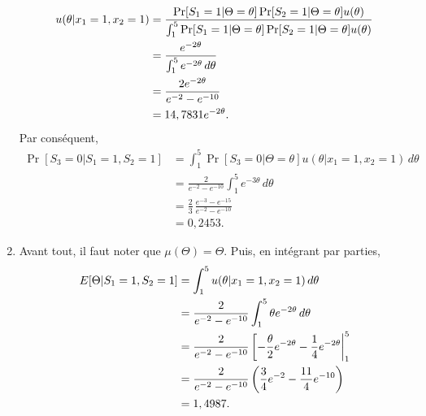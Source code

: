 \begin{exercice}
\begin{sol}
\begin{enumerate}
\begin{align*}
        u(\theta|x_1=1, x_2=1)
        &= \frac{\Pr[S_1 = 1|\Theta = \theta]
          \Pr[S_2 = 1|\Theta = \theta] u(\theta)}{%
          \int_1^5 \Pr[S_1 = 1|\Theta = \theta]
          \Pr[S_2 = 1|\Theta = \theta] u(\theta)} \\
        &= \frac{e^{-2 \theta}}{\int_1^5 e^{-2 \theta}\, d\theta} \\
        &= \frac{2 e^{-2 \theta}}{e^{-2} - e^{-10}} \\
        &= 14,7831 e^{-2\theta}.
      \end{align*}
      Par conséquent,
      \begin{align*}
        \Pr[S_3 = 0|S_1 = 1, S_2 = 1]
        &= \int_1^5 \Pr[S_3 = 0|\Theta = \theta]
        u(\theta|x_1=1, x_2=1)\, d\theta \\
        &= \frac{2}{e^{-2} - e^{-10}}
        \int_1^5 e^{-3 \theta}\, d\theta \\
        &= \frac{2}{3}\, \frac{e^{-3} - e^{-15}}{e^{-2} - e^{-10}} \\
        &= 0,2453.
      \end{align*}
    \item Avant tout, il faut noter que $\mu(\Theta) = \Theta$. Puis,
      en intégrant par parties,
      \begin{align*}
        E [ \Theta|S_1 = 1, S_2 = 1 ]
        &= \int_1^5 u(\theta|x_1 = 1, x_2 = 1)\, d\theta \\
        &= \frac{2}{e^{-2} - e^{-10}}
        \int_1^5 \theta e^{-2 \theta}\, d\theta \\
        &= \frac{2}{e^{-2} - e^{-10}}
        \left[
          -\frac{\theta}{2} e^{-2\theta} - \frac{1}{4} e^{-2 \theta}
        \right|_1^5 \\
        &= \frac{2}{e^{-2} - e^{-10}}
        \left(
          \frac{3}{4} e^{-2} - \frac{11}{4} e^{-10}
        \right) \\
        &= 1,4987.
      \end{align*}
    \end{enumerate}
  \end{sol}
\end{exercice}

